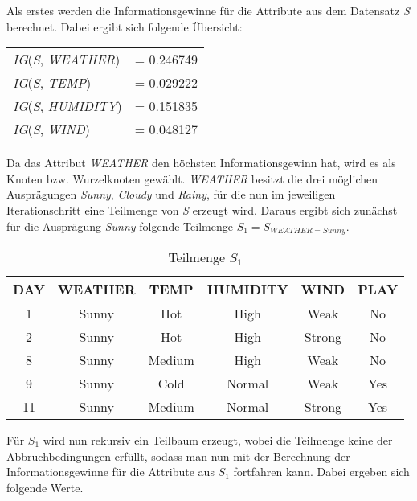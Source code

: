 Als erstes werden die Informationsgewinne für die Attribute aus dem Datensatz \textit{S} berechnet. Dabei ergibt sich folgende Übersicht:

\begin{table}[htbp]
    \centering
    \begin{tabular}{lc}
        \textit{IG}(\textit{S}, \textit{WEATHER})  &= 0.246749 \\
        \textit{IG}(\textit{S}, \textit{TEMP})     &= 0.029222 \\
        \textit{IG}(\textit{S}, \textit{HUMIDITY}) &= 0.151835 \\
        \textit{IG}(\textit{S}, \textit{WIND})     &= 0.048127 \\
    \end{tabular}
\end{table}

Da das Attribut \textit{WEATHER} den höchsten Informationsgewinn hat, wird es als Knoten bzw. Wurzelknoten gewählt. \textit{WEATHER} besitzt die drei möglichen Ausprägungen \textit{Sunny}, \textit{Cloudy} und \textit{Rainy}, für die nun im jeweiligen Iterationschritt eine Teilmenge von \textit{S} erzeugt wird. Daraus ergibt sich zunächst für die Ausprägung \textit{Sunny} folgende Teilmenge $S_{1} = S_{WEATHER=Sunny}$.

\begin{table}[H]
    \centering
    \begin{tabular}{cccccc}
        \toprule
        \textbf{DAY} & \textbf{WEATHER} & \textbf{TEMP} & \textbf{HUMIDITY} & \textbf{WIND} & \textbf{PLAY} \\
        \toprule
        1   &Sunny	&Hot	&High	&Weak	&No  \\
        2   &Sunny	&Hot	&High	&Strong	&No  \\
        8   &Sunny	&Medium	&High	&Weak	&No  \\
        9   &Sunny	&Cold	&Normal	&Weak	&Yes \\
        11  &Sunny	&Medium	&Normal	&Strong	&Yes \\
        \bottomrule
    \end{tabular}
    \caption{Teilmenge $S_{1}$}
    \label{table:datensatz-sunny}
\end{table}

Für $S_{1}$ wird nun rekursiv ein Teilbaum erzeugt, wobei die Teilmenge keine der Abbruchbedingungen erfüllt, sodass man nun mit der Berechnung der Informationsgewinne für die Attribute aus $S_{1}$ fortfahren kann. Dabei ergeben sich folgende Werte.

